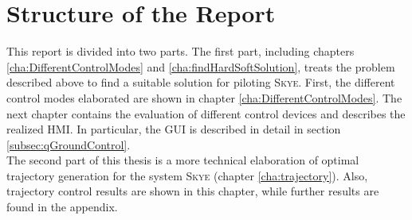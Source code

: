 \section{Structure of the Report}
\label{structure}
This report is divided into two parts. The first part, including chapters \ref{cha:DifferentControlModes} and \ref{cha:findHardSoftSolution}, treats the problem described above to find a suitable solution for piloting \textsc{Skye}. First, the different control modes elaborated are shown in chapter \ref{cha:DifferentControlModes}. The next chapter contains the evaluation of different control devices and describes the realized HMI. In particular, the GUI is described in detail in section \ref{subsec:qGroundControl}. \\ The second part of this thesis is a more technical elaboration of optimal trajectory generation for the system \textsc{Skye} (chapter \ref{cha:trajectory}). Also, trajectory control results are shown in this chapter, while further results are found in the appendix.